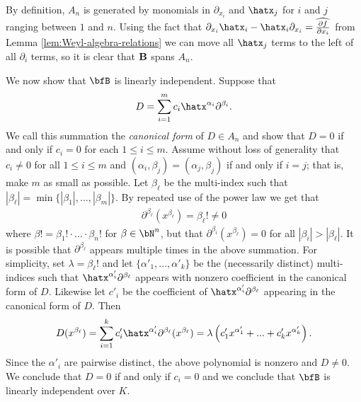 \begin{prf}
	By definition, $A_n$ is generated by monomials in $\partial_{x_i}$ and $\hatx_j$ for $i$ and $j$ ranging between $1$ and $n$. Using the fact that $\partial_{x_i}\hatx_i - \hatx_i\partial_{x_i} = \widehat{\frac{\partial f}{\partial x_i}}$ from Lemma \ref{lem:Weyl-algebra-relations} we can move all $\hatx_j$ terms to the left of all $\partial_i$ terms, so it is clear that $\bf{B}$ spans $A_n$. 

	We now show that $\bfB$ is linearly independent. Suppose that 
	\begin{align*}
		D = \sum_{i=1}^m c_{i}\hatx^{\alpha_i}\partial^{\beta_i}.
	\end{align*}
	We call this summation the \emph{canonical form} of $D \in A_n$ and show that $D = 0$ if and only if $c_i = 0$ for each $1\leq i\leq m$. Assume without loss of generality that $c_i \neq 0$ for all $1\leq i\leq m$ and $(\alpha_i,\beta_j) = (\alpha_j,\beta_j)$ if and only if $i = j$; that is, make $m$ as small as possible. Let $\beta_\ell$ be the multi-index such that $|\beta_\ell| = \min\{|\beta_1|,...,|\beta_m|\}$. By repeated use of the power law we get that
	\begin{align*}
		\partial^{\beta_\ell}(x^{\beta_\ell}) = \beta_\ell! \neq 0
	\end{align*}
	where $\beta! = \beta_1!\cdot...\cdot \beta_n!$ for $\beta \in \bN^n$, but that $\partial^{\beta_i}(x^{\beta_\ell}) = 0$ for all $|\beta_i| > |\beta_\ell|$. It is possible that $\partial^{\beta_\ell}$ appears multiple times in the above summation. For simplicity, set $\lambda = \beta_\ell!$ and let $\{\alpha'_1,...,\alpha'_k\}$ be the (necessarily distinct) multi-indices such that $\hatx^{\alpha'_i}\partial^{\beta_\ell}$ appears with nonzero coefficient in the canonical form of $D$. Likewise let $c'_i$ be the coefficient of $\hatx^{\alpha'_i}\partial^{\beta_\ell}$ appearing in the canonical form of $D$. Then
	\begin{align*}
		D(x^{\beta_\ell}) = \sum_{i=1}^k c'_{i}\hatx^{\alpha'_i}\partial^{\beta_\ell}(x^{\beta_\ell}) = \lambda \left(c'_1x^{\alpha'_1} + ... + c'_kx^{\alpha'_k}\right).
	\end{align*}
	Since the $\alpha'_i$ are pairwise distinct, the above polynomial is nonzero and $D \neq 0$. We conclude that $D = 0$ if and only if $c_i = 0$ and we conclude that $\bfB$ is linearly independent over $K$.
\end{prf}

